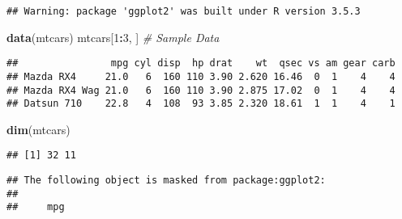 \documentclass[]{article}
\newenvironment{Shaded}{\begin{snugshade}}{\end{snugshade}}
\newcommand{\KeywordTok}[1]{\textcolor[rgb]{0.13,0.29,0.53}{\textbf{#1}}}
\newcommand{\DecValTok}[1]{\textcolor[rgb]{0.00,0.00,0.81}{#1}}
\newcommand{\StringTok}[1]{\textcolor[rgb]{0.31,0.60,0.02}{#1}}
\newcommand{\CommentTok}[1]{\textcolor[rgb]{0.56,0.35,0.01}{\textit{#1}}}
\newcommand{\OperatorTok}[1]{\textcolor[rgb]{0.81,0.36,0.00}{\textbf{#1}}}
\newcommand{\NormalTok}[1]{#1}
\begin{document}
\begin{verbatim}
## Warning: package 'ggplot2' was built under R version 3.5.3
\end{verbatim}

\begin{Shaded}
\begin{Highlighting}[]
\KeywordTok{data}\NormalTok{(mtcars)}
\NormalTok{mtcars[}\DecValTok{1}\OperatorTok{:}\DecValTok{3}\NormalTok{, ] }\CommentTok{# Sample Data}
\end{Highlighting}
\end{Shaded}

\begin{verbatim}
##                mpg cyl disp  hp drat    wt  qsec vs am gear carb
## Mazda RX4     21.0   6  160 110 3.90 2.620 16.46  0  1    4    4
## Mazda RX4 Wag 21.0   6  160 110 3.90 2.875 17.02  0  1    4    4
## Datsun 710    22.8   4  108  93 3.85 2.320 18.61  1  1    4    1
\end{verbatim}

\begin{Shaded}
\begin{Highlighting}[]
\KeywordTok{dim}\NormalTok{(mtcars)}
\end{Highlighting}
\end{Shaded}

\begin{verbatim}
## [1] 32 11
\end{verbatim}

\begin{Shaded}
\end{Shaded}

\begin{verbatim}
## The following object is masked from package:ggplot2:
## 
##     mpg
\end{verbatim}
\end{document}

